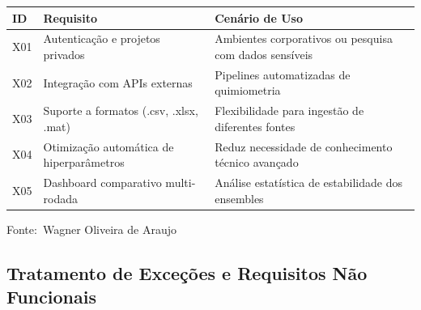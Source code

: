 \documentclass[12pt,a4paper]{article}
\newcommand{\oautor}{Wagner Oliveira de Araujo}
\begin{document}
\begin{quadro}[ht]
\begin{center}
\small
\caption{Requisitos extras para fases futuras (Could Have)}
\label{quadro:extras}
\begin{threeparttable}
\begin{tabularx}{\textwidth}{|l|X|X|} \hline
\textbf{ID} & \textbf{Requisito} & \textbf{Cenário de Uso} \\ \hline
X01 & Autenticação e projetos privados & Ambientes corporativos ou pesquisa com dados sensíveis \\ \hline
X02 & Integração com APIs externas & Pipelines automatizadas de quimiometria \\ \hline
X03 & Suporte a formatos (.csv, .xlsx, .mat) & Flexibilidade para ingestão de diferentes fontes \\ \hline
X04 & Otimização automática de hiperparâmetros & Reduz necessidade de conhecimento técnico avançado \\ \hline
X05 & Dashboard comparativo multi-rodada & Análise estatística de estabilidade dos ensembles \\ \hline
\end{tabularx}
\begin{tablenotes}[flushleft]
\footnotesize
\item Fonte:~\oautor
\end{tablenotes}
\end{threeparttable}
\end{center}
\end{quadro}

\subsection{Tratamento de Exceções e Requisitos Não Funcionais}
\end{document}
